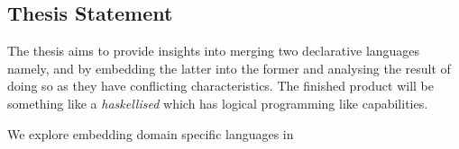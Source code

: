 \begin{unbcabstract}
\section{Thesis Statement}

The thesis  aims to provide insights into merging two declarative languages namely,  and  by embedding 
the latter into the former and analysing the result of doing so as they have conflicting characteristics. The finished product will be 
something like a \textit{haskellised}  which has logical programming like capabilities.       

We explore embedding domain specific languages in  

       
\end{unbcabstract}

